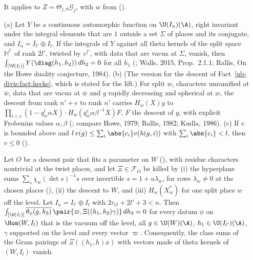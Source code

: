 It applies to $Z=\Theta_{j,\vartheta}\mathcal G_j$, with $w$ from
 ().

\begin{fact}\label{ol-values:fact:tower}
(a) Let $Y$ be a continuous automorphic function on $\U(I_n)(\A)$, right invariant under the
integral elements that are $1$ outside a set $\Sigma$ of places and its conjugate, and
$I_n=I_{l'}\oplus I_l$. If the integrals of $Y$ against all theta kernels of the split space
$\mathbb H^{l'}$ of rank $2l'$, twisted by $\upsilon^{l'}$, with data that are vacua at $\Sigma$,
vanish, then $\int_{[\U(I_l)]}Y(\diag(h_1,h_2))\,dh_2=0$ for all $h_1$
(; Walls, 2015, Prop.~2.1.1;
Rallis, On the Howe duality conjecture, 1984). (b) (The version for the descent of Fact~\ref{ub-divis:fact:hecke}, which is stated for the
lift.) For split $w$, characters unramified at $\bar w$, data that are vacua at $\bar w$
and $y$ rapidly decreasing and spherical at $w$, the descent from rank $n'+e$
to rank $n'$ carries $H_w(X)y$ to $\prod_{l<e}(1-q_w^l\alpha X)\cdot H_w(q_w^e\alpha\beta^{-1}X)F$, $F$
the descent of $y$, with explicit Frobenius values $\alpha,\beta$
(; compare Howe, 1979; Rallis, 1982; Kudla, 1986). (c) If $v$ is bounded above and
$l\,v(g)\le\sum_i\abs{c_i}v(h(g,i))$ with $\sum_i\abs{c_i}<l$, then $v\le0$
().
\end{fact}

\begin{theorem}\label{ol-values:thm:periods}
Let $O$ be a descent pair that fits a parameter on $W$ (), with
residue characters nontrivial at the twist places, and let
$\Xi\in\mathcal F_O$ be killed by (i) the hyperplane sums $\sum_s\chi_w(\det s)^{-1}s$ over
invertible $s=1+u\lambda_w$, for rows $\lambda_w\ne0$ at the chosen places
(), (ii) the
descent to $W$, and (iii) $H_w(X^*_w)$ for one split place $w$ off the level. Let
$I_n=I_{l'}\oplus I_l$ with $2r_O+2l'+3<n$. Then $\int_{[\U(I_l)]}\overline{\theta_\phi(g,h_2)}\,\pair{\varpi,\Xi((h_1,h_2)\gamma)}\,dh_2=0$
for every datum $\phi$ on $\Hom(W,I_l)$ that is the vacuum off the level, all $g\in\U(W)(\A)$,
$h_1\in\U(I_{l'})(\A)$, $\gamma$ supported on the level and every vector $\varpi$. Consequently, the class sums of the Gram pairings of $\Xi((h_1,h)x)$ with vectors made of theta
kernels of $(W,I_l)$ vanish.
\end{theorem}

